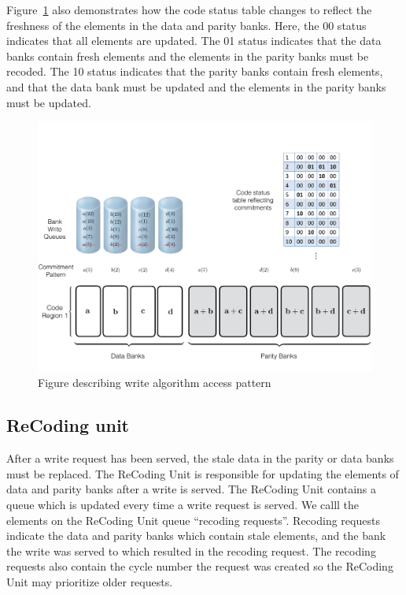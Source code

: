 Figure~\ref{fig:writeAlgoAccessPattern} also demonstrates how the code status table changes to reflect the freshness of the elements in the data and parity banks. Here, the 00 status indicates that all elements are updated. The 01 status indicates that the data banks contain fresh elements and the elements in the parity banks must be recoded. The 10 status indicates that the parity banks contain fresh elements, and that the data bank must be updated and the elements in the parity banks must be updated.

\begin{figure}[t!]
\centering
         \includegraphics[width=\linewidth]{fig/Write-Algo-Example.pdf}
	\caption{Figure describing write algorithm access pattern}
	\label{fig:writeAlgoAccessPattern}
\end{figure}
\subsection{ReCoding unit}
\label{sec:recoding}
After a write request has been served, the stale data in the parity or data banks must be replaced. The ReCoding Unit is responsible for updating the elements of data and parity banks after a write is served. The ReCoding Unit contains a queue which is updated every time a write request is served. We calll the elements on the ReCoding Unit queue “recoding requests”. Recoding requests indicate the data and parity banks which contain stale elements, and the bank the write was served to which resulted in the recoding request. The recoding requests also contain the cycle number the request was created so the ReCoding Unit may prioritize older requests. 

